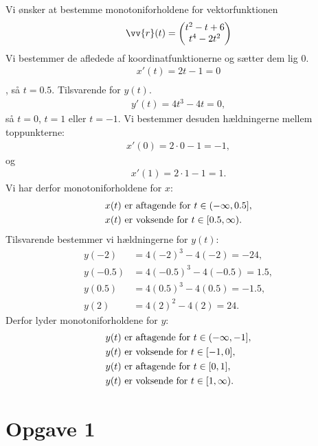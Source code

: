 \begin{exa}
Vi ønsker at bestemme monotoniforholdene for vektorfunktionen 
\begin{align*}
	\vv{r}(t) = 
	\begin{pmatrix}
		t^2-t+6 \\
		t^4-2t^2
	\end{pmatrix}
\end{align*}
Vi bestemmer de afledede af koordinatfunktionerne og sætter dem lig 0.
\begin{align*}
	x'(t) = 2t-1 = 0\\
\end{align*},
så $t=0.5$.
Tilsvarende for $y(t)$.
\begin{align*}
	y'(t) = 4t^3-4t = 0,
\end{align*}
så $t=0$, $t=1$ eller $t=-1$. 
Vi bestemmer desuden hældningerne mellem toppunkterne:
\begin{align*}
	x'(0) = 2\cdot 0 -1 = -1,
\end{align*}
og
\begin{align*}
	x'(1) = 2\cdot 1-1 = 1.
\end{align*}
Vi har derfor monotoniforholdene for $x$:
\begin{align*}
	&\textnormal{$x(t)$ er aftagende for $t\in (-\infty,0.5]$},\\
	&\textnormal{$x(t)$ er voksende for $t \in [0.5,\infty)$}.
\end{align*}
Tilsvarende bestemmer vi hældningerne for $y(t)$:
\begin{align*}
	y(-2) &= 4(-2)^3 -4(-2) = -24,\\
	y(-0.5) &= 4(-0.5)^3 - 4(-0.5) = 1.5,\\
	y(0.5) &= 4(0.5)^3 - 4(0.5) = -1.5,\\
	y(2) &= 4(2)^2 - 4(2) = 24.
\end{align*}
Derfor lyder monotoniforholdene for $y$:
\begin{align*}
	&\textnormal{$y(t)$ er aftagende for $t\in (-\infty,-1]$},\\
	&\textnormal{$y(t)$ er voksende for $t \in [-1,0]$},\\
	&\textnormal{$y(t)$ er aftagende for $t\in [0,1]$},\\
	&\textnormal{$y(t)$ er voksende for $t \in [1,\infty)$}.
\end{align*}

\end{exa}

\section*{Opgave 1}


